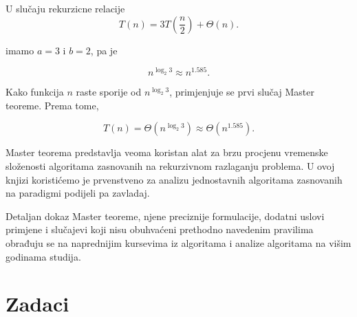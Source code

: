 \begin{example}
	U slučaju rekurzicne relacije
	\[
	T(n)=3T\left(\frac{n}{2}\right)+\Theta(n).
	\]
	
	imamo $a=3$ i $b=2$, pa je
	
	\[
	n^{\log_2 3}\approx n^{1.585}.
	\]
	
	Kako funkcija $n$ raste sporije od $n^{\log_2 3}$, primjenjuje se prvi slučaj
	Master teoreme. Prema tome,
	
	\[
	T(n)=\Theta\left(n^{\log_2 3}\right)
	\approx \Theta\left(n^{1.585}\right).
	\]
\end{example}

Master teorema predstavlja veoma koristan alat za brzu procjenu vremenske
složenosti algoritama zasnovanih na rekurzivnom razlaganju problema. U ovoj
knjizi koristićemo je prvenstveno za analizu jednostavnih algoritama zasnovanih
na paradigmi podijeli pa zavladaj.

Detaljan dokaz Master teoreme, njene preciznije formulacije, dodatni uslovi
primjene i slučajevi koji nisu obuhvaćeni prethodno navedenim pravilima
obrađuju se na naprednijim kursevima iz algoritama i analize algoritama na
višim godinama studija.



\section*{Zadaci}

